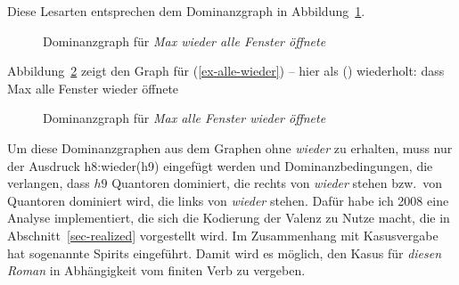 \noindent
Diese Lesarten entsprechen dem Dominanzgraph in Abbildung~\ref{Abbildung-Max-wieder-alle-Fenster-oeffnete}.
\begin{figure}
\caption{Dominanzgraph für \emph{Max wieder alle Fenster öffnete}\label{Abbildung-Max-wieder-alle-Fenster-oeffnete}}
\end{figure}
Abbildung~\ref{Abbildung-Max-alle-Fenster-wieder-oeffnete} zeigt den Graph für (\ref{ex-alle-wieder}) -- hier als () wiederholt:
\ea
\label{ex-alle-wieder-zwei}
dass Max alle Fenster wieder öffnete
\z
\begin{figure}
\caption{Dominanzgraph für \emph{Max alle Fenster wieder öffnete}\label{Abbildung-Max-alle-Fenster-wieder-oeffnete}}
\end{figure}
Um diese Dominanzgraphen aus dem Graphen ohne \emph{wieder} zu erhalten, muss nur der Ausdruck h8:wieder(h9)
eingefügt werden und Dominanzbedingungen, die verlangen, dass $h9$ Quantoren dominiert, die rechts
von \emph{wieder} stehen bzw.\ von Quantoren dominiert wird, die links von \emph{wieder}
stehen. Dafür habe ich 2008 eine Analyse implementiert, die sich die Kodierung der Valenz zu Nutze
macht, die in Abschnitt~\ref{sec-realized} vorgestellt wird. Im Zusammenhang mit Kasusvergabe hat
\citet{Meurers99b} sogenannte Spirits eingeführt. Damit wird es möglich, den Kasus für \emph{diesen
  Roman} in Abhängigkeit vom finiten Verb zu vergeben.
